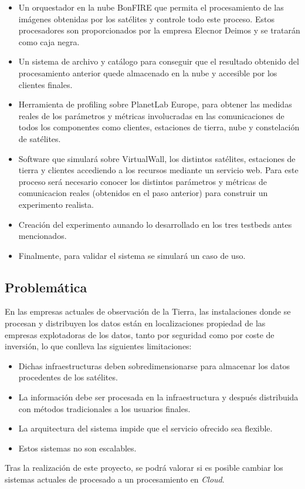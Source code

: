 \begin{itemize}
\item Un orquestador en la nube BonFIRE que permita el procesamiento de las imágenes obtenidas por los satélites y controle todo este proceso. Estos procesadores son proporcionados por la empresa Elecnor Deimos y se tratarán como caja negra.

\item Un sistema de archivo y catálogo para conseguir que el resultado obtenido del procesamiento anterior quede almacenado en la nube y accesible por los clientes finales.

\item Herramienta de profiling sobre PlanetLab Europe, para obtener las medidas reales de los parámetros y métricas involucradas en las comunicaciones de todos los componentes como clientes, estaciones de tierra, nube y constelación de satélites.

\item Software que simulará sobre VirtualWall, los distintos satélites, estaciones de tierra y clientes accediendo a los recursos mediante un servicio web. Para este proceso será necesario  conocer los distintos parámetros y métricas de comunicacion reales (obtenidos en el paso anterior)  para construir un experimento realista.

\item Creación del experimento aunando lo desarrollado en los tres testbeds antes mencionados.

\item Finalmente, para validar el sistema se simulará un caso de uso.
\end{itemize}


\subsection{Problemática}
\label{sec:problematica}

En las empresas actuales de observación de la Tierra,  las instalaciones donde se procesan y distribuyen los datos están en localizaciones propiedad de las empresas explotadoras de los datos, tanto por seguridad como por coste de inversión, lo que conlleva las siguientes limitaciones:
\begin{itemize}
\item Dichas infraestructuras deben sobredimensionarse para almacenar los datos procedentes de los satélites.
\item La información debe ser procesada en la infraestructura y después distribuida con métodos tradicionales a los usuarios finales.
\item La arquitectura del sistema impide que el servicio ofrecido sea flexible.
\item Estos sistemas no son escalables.
\end{itemize}

Tras la realización de este proyecto, se podrá valorar si es posible  cambiar los sistemas actuales de procesado a un procesamiento en \emph{Cloud}.

